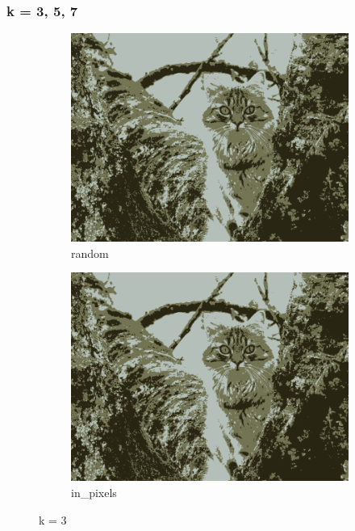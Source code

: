 \documentclass{article}
\begin{document}
\subsubsection{k = 3, 5, 7}
\begin{figure}[h!]
  \begin{subfigure}{.5\textwidth}
    \centering
    \includegraphics[width=.8\linewidth]{image/random_3.png}
    \caption{random}
    \label{fig:sfig1}
  \end{subfigure}%
  \begin{subfigure}{.5\textwidth}
    \centering
    \includegraphics[width=.8\linewidth]{image/in_3.png}
    \caption{in\_pixels}
    \label{fig:sfig2}
  \end{subfigure}
  \caption{k = 3}
  \label{fig:fig}
\end{figure}
\end{document}
